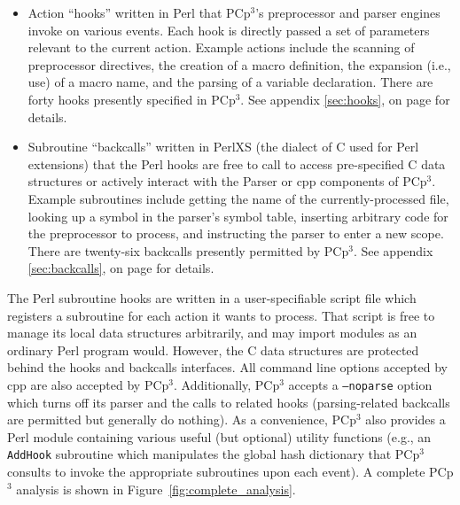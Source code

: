 \documentclass{article}
\newcommand{\pcp}{\mbox{\textsf{PCp}$^3$}}
\newcommand{\Cpp}{\mbox{\textsf{cpp}}}
\newcommand{\Perl}{\mbox{\textsf{Perl}}}
\newcommand{\C}{\mbox{\textsf{C}}}
\newcommand{\appendixref}[1]{appendix \ref{#1}, on page \pageref{#1}}
\newcommand{\ie}{i.e.,}
\newcommand{\eg}{e.g.,}
\newcommand{\figref}[1]{Figure~\ref{#1}}
\begin{document}
\begin{itemize}
\item Action ``hooks'' written in \Perl{} that \pcp{}'s preprocessor and
      parser engines invoke on various events. Each hook is directly
      passed a set of parameters relevant to the current action.
      Example actions include the scanning of preprocessor directives,
      the creation of a macro definition, the expansion (\ie{} use) of a
      macro name, and the parsing of a variable declaration.  There are
      forty hooks presently specified in \pcp{}. See
      \appendixref{sec:hooks} for details.
\item Subroutine ``backcalls'' written in {PerlXS} (the dialect of \C{}
      used for \Perl{} extensions) that the \Perl{} hooks are free to
      call to access pre-specified \C{} data structures or actively
      interact with the Parser or \Cpp{} components of \pcp{}.  Example
      subroutines include getting the name of the currently-processed
      file, looking up a symbol in the parser's symbol table, inserting
      arbitrary code for the preprocessor to process, and instructing the
      parser to enter a new scope.  There are twenty-six backcalls
      presently permitted by \pcp{}.  See \appendixref{sec:backcalls}
      for details.
\end{itemize}

\noindent The \Perl{} subroutine hooks are written in a user-specifiable script
file which registers a subroutine for each action it wants to process.
That script is free to manage its local data structures arbitrarily, and
may import modules as an ordinary \Perl{} program would.  However, the
\C{} data structures are protected behind the hooks and backcalls
interfaces. All command line options accepted by \Cpp{} are also
accepted by \pcp{}.  Additionally, \pcp{} accepts a \texttt{--noparse}
option which turns off its parser and the calls to related hooks
(parsing-related backcalls are permitted but generally do nothing).  As
a convenience, \pcp{} also provides a \Perl{} module containing various
useful (but optional) utility functions (\eg{} an \texttt{AddHook}
subroutine which manipulates the global hash dictionary
that \pcp{} consults to invoke the appropriate subroutines upon each
event). A complete \pcp{} analysis is shown in
\figref{fig:complete_analysis}.
\end{document}
